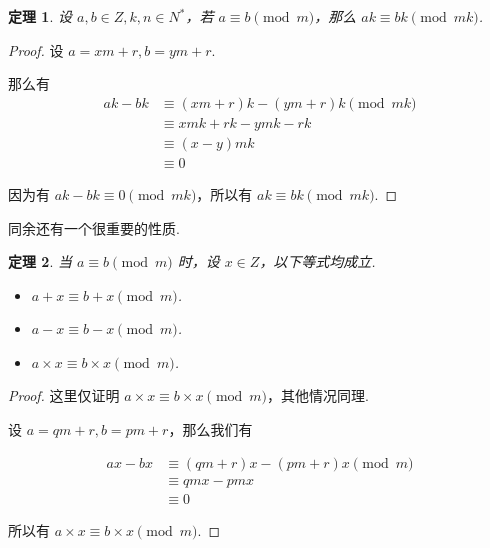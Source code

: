 \documentclass[a4paper]{article}
\newtheorem{theorem}{定理}[section]
\begin{document}
\begin{theorem}
    设 $a,b \in Z, k,n\in N^*$，若 $a\equiv b \pmod m$，那么
    $ak\equiv bk \pmod {mk}$.
\end{theorem}

\begin{proof}
    设 $a=xm+r,b=ym+r$.

    那么有
    \begin{equation*}
        \begin{split}
            ak-bk&\equiv (xm+r)k-(ym+r)k\pmod {mk}\\
            &\equiv xmk+rk-ymk-rk\\
            &\equiv (x-y)mk\\
            &\equiv 0
        \end{split}
    \end{equation*}

    因为有 $ak-bk\equiv 0 \pmod {mk}$，所以有 $ak \equiv bk \pmod {mk}$.
\end{proof}

同余还有一个很重要的性质.

\begin{theorem}
    当 $a\equiv b \pmod m$ 时，设 $x\in Z$，以下等式均成立.

    \begin{itemize}
        \item $a+x \equiv b+x \pmod m$.
        \item $a-x \equiv b-x \pmod m$.
        \item $a\times x \equiv b\times x \pmod m$.
    \end{itemize}
\end{theorem}

\begin{proof}
    这里仅证明 $a\times x \equiv b\times x \pmod m$，其他情况同理.

    设 $a=qm+r,b=pm+r$，那么我们有

    \begin{equation*}
        \begin{split}
            ax-bx &\equiv (qm+r)x-(pm+r)x\pmod m\\
            &\equiv qmx-pmx\\
            &\equiv 0
        \end{split}
    \end{equation*}

    所以有 $a\times x \equiv b\times x \pmod m$.
\end{proof}
\end{document}
